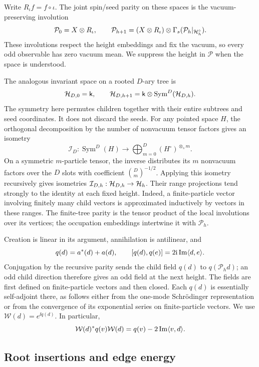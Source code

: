 Write $R_\iota f=f\circ\iota$.  The joint spin/seed parity on these
spaces is the vacuum-preserving involution
\[
 \mathcal{P}_0=X\otimes R_\iota,\qquad
 \mathcal{P}_{h+1}=(X\otimes R_\iota)\otimes
       \Gamma_s(\mathcal{P}_h|_{\mathcal H_h^\circ}).
\]
These involutions respect the height embeddings and fix the vacuum,
so every odd observable has zero vacuum mean.  We suppress the height
in $\mathscr P$ when the space is understood.

The analogous invariant space on a rooted $D$-ary tree is
\[
 \mathcal H_{D,0}=\mathsf k,\qquad
 \mathcal H_{D,h+1}=\mathsf k\otimes\operatorname{Sym}^D(\mathcal H_{D,h}).
\]
The symmetry here permutes children together with their entire
subtrees and seed coordinates.  It does not discard the seeds.  For
any pointed space $H$, the orthogonal decomposition by the number
of nonvacuum tensor factors gives an isometry
\begin{equation}\label{eq:occupation-embedding}
 \mathcal I_D:\operatorname{Sym}^D(H)\longrightarrow
       \bigoplus_{m=0}^D(H^\circ)^{\otimes_s m}.
\end{equation}
On a symmetric $m$-particle tensor, the inverse distributes its $m$
nonvacuum factors over the $D$ slots with coefficient
$\binom Dm^{-1/2}$.  Applying this isometry recursively gives
isometries $\mathcal I_{D,h}:\mathcal H_{D,h}\to\mathcal H_h$.  Their range
projections tend strongly to the identity at each fixed height.
Indeed, a finite-particle vector involving finitely many child
vectors is approximated inductively by vectors in these ranges.
The finite-tree parity is the tensor product of the local
involutions over its vertices; the occupation embeddings
intertwine it with $\mathscr P_h$.

Creation is linear in its argument, annihilation is antilinear, and
\[
 q(d)=a^*(d)+a(d),\qquad
 [q(d),q(e)]=2\mathrm i\operatorname{Im}\langle d,e\rangle.
\]
Conjugation by the recursive parity sends the child field $q(d)$
to $q(\mathscr P_h d)$; an odd child direction therefore gives
an odd field at the next height.
The fields are first defined on finite-particle vectors and then
closed.  Each $q(d)$ is essentially self-adjoint there, as follows
either from the one-mode Schr\"odinger representation or from the
convergence of its exponential series on finite-particle vectors.
We use $\mathcal W(d)=e^{\ii q(d)}$.  In particular,
\begin{equation}\label{eq:weyl-shift}
 \mathcal W(d)^*q(v)\mathcal W(d)
       =q(v)-2\operatorname{Im}\langle v,d\rangle.
\end{equation}

\subsection{Root insertions and edge energy}
\label{sec:root-energy}

